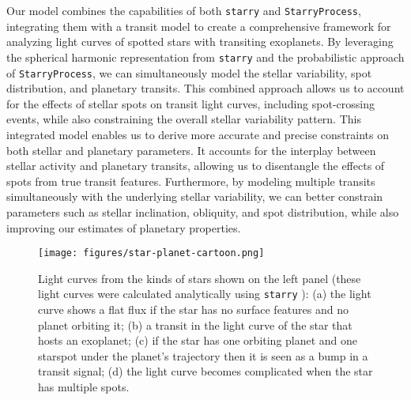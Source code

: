 \documentclass[twocolumn]{aastex631}
\begin{document}
Our model combines the capabilities of both \texttt{starry} and \texttt{StarryProcess}, integrating them with a transit model to 
create a comprehensive framework for analyzing light curves of spotted stars with transiting exoplanets. By leveraging the spherical harmonic 
representation from \texttt{starry} and the probabilistic approach of \texttt{StarryProcess}, we can simultaneously model the stellar variability, 
spot distribution, and planetary transits. This combined approach allows us to account for the effects of stellar spots on transit light curves, 
including spot-crossing events, while also constraining the overall stellar variability pattern. This integrated model enables us to derive more 
accurate and precise constraints on both stellar and planetary parameters. It accounts for the interplay between stellar activity and planetary transits, 
allowing us to disentangle the effects of spots from true transit features. Furthermore, by modeling multiple transits simultaneously with the 
underlying stellar variability, we can better constrain parameters such as stellar inclination, obliquity, and spot distribution, 
while also improving our estimates of planetary properties.

\begin{figure*}[hbt!]
    \texttt{[image: figures/star-planet-cartoon.png]}
        \caption{Light curves from the kinds of stars shown on the left panel (these light curves were calculated analytically 
        using \texttt{starry} \citep{Luger2019}): (a) the light curve shows a flat flux if the star has no surface features and no planet orbiting it; 
        (b) a transit in the light curve of the star that hosts an exoplanet; (c) if the star has one orbiting planet and one starspot under the planet's 
        trajectory then it is seen as a bump in a transit signal; (d) the light curve becomes complicated when the star has multiple spots.}
        \label{fig:cartoon}
    \end{figure*}
\end{document}
